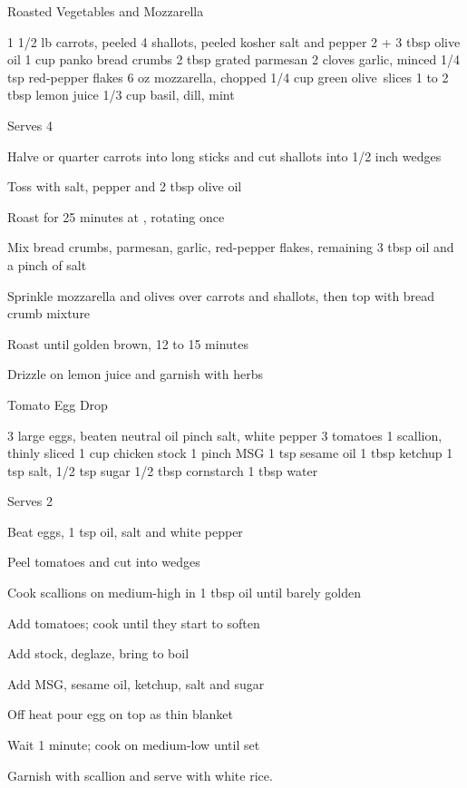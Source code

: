 \begin{denserecipe}{Roasted Vegetables and Mozzarella}{}
\begin{ingredients}
1 1/2 lb carrots, peeled
4 shallots, peeled
kosher salt and pepper
2 + 3 tbsp olive oil
1 cup panko bread crumbs
2 tbsp grated parmesan
2 cloves garlic, minced
1/4 tsp red-pepper flakes
6 oz mozzarella, chopped
1/4 cup green \mbox{olive slices}
1 to 2 tbsp lemon juice
1/3 cup basil, dill, mint
\end{ingredients}
\nextcolumn
Serves 4
\begin{steps}
\item Halve or quarter carrots into long sticks and cut shallots into 1/2 inch wedges
\item Toss with salt, pepper and 2 tbsp olive oil
\item Roast for 25 minutes at , rotating once
\item Mix bread crumbs, parmesan, garlic, red-pepper flakes, remaining 3 tbsp oil and a pinch of salt
\item Sprinkle mozzarella and olives over carrots and shallots, then top with bread crumb mixture
\item Roast until golden brown, 12 to 15 minutes
\item Drizzle on lemon juice and garnish with herbs
\end{steps}
\end{denserecipe}

\begin{denserecipe}{Tomato Egg Drop}{}
\begin{ingredients}
3 large eggs, beaten
neutral oil
pinch salt, white pepper
3 tomatoes
1 scallion, thinly sliced
1 cup chicken stock
1 pinch MSG
1 tsp sesame oil
1 tbsp ketchup
1 tsp salt, 1/2 tsp sugar
1/2 tbsp cornstarch
1 tbsp water
\end{ingredients}
\nextcolumn
Serves 2
\begin{steps}
    \item Beat eggs, 1 tsp oil, salt and white pepper
    \item Peel tomatoes and cut into wedges
    \item Cook scallions on medium-high in 1 tbsp oil until barely golden
    \item Add tomatoes; cook until they start to soften
    \item Add stock, deglaze, bring to boil
    \item Add MSG, sesame oil, ketchup, salt and sugar
    \item Off heat pour egg on top as thin blanket
    \item Wait 1 minute; cook on medium-low until set
\end{steps}
Garnish with scallion and serve with white rice.
\end{denserecipe}

